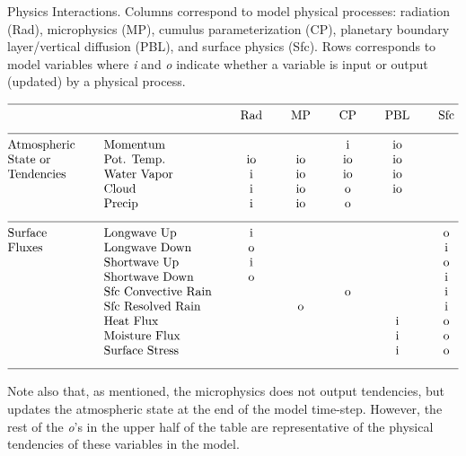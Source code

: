 \begin{table}
\caption{Physics Interactions. Columns correspond to
model physical processes: radiation (Rad),
microphysics (MP), cumulus parameterization (CP), planetary boundary layer/vertical diffusion
(PBL), and surface physics (Sfc). Rows corresponds to
model variables where {\em i} and {\em o} indicate whether a variable is
input or output (updated) by a physical process.}
\label{physics interaction table}
$$\vbox
{\halign{#\hfil \qquad & #\hfil \qquad & \hfil#\hfil \qquad & \hfil#\hfil
\qquad & \hfil#\hfil \qquad &  \hfil#\hfil \qquad & \hfil#\hfil \cr
\multispan7\hrulefill \cr
                &              & Rad       & MP           & CP           & PBL      &   Sfc   \cr
\multispan7\hrulefill \cr
Atmospheric     &  Momentum    &           &              &      i       &  io     &           \cr
State or        &  Pot. Temp.  &   io      &     io       &     io       &  io     &           \cr
Tendencies      &  Water Vapor &    i      &     io       &     io       &  io     &           \cr
                &  Cloud       &    i      &     io       &      o       &  io     &           \cr
                &  Precip      &    i      &     io       &      o       &         &           \cr
\multispan7\hrulefill \cr
Surface         &  Longwave Up &    i      &              &              &         &    o      \cr
Fluxes          &  Longwave Down &  o      &              &              &         &    i      \cr
                &  Shortwave Up &   i      &              &              &         &    o      \cr
                &  Shortwave Down & o      &              &              &         &    i      \cr
                &  Sfc Convective Rain &   &              &      o       &         &    i      \cr
                &  Sfc Resolved Rain &     &      o       &              &         &    i      \cr
                &  Heat Flux &             &              &              &   i     &    o      \cr
                &  Moisture Flux &         &              &              &   i     &    o      \cr
                &  Surface Stress &        &              &              &   i     &    o      \cr
\multispan7\hrulefill \cr
}}$$
\end{table}

Note also that, as mentioned, the microphysics does not output tendencies,
but updates the atmospheric state at the end of the model time-step. 
However, the rest of the {\em o}'s in the upper half of the table are
representative of the physical tendencies of these variables in the model.

